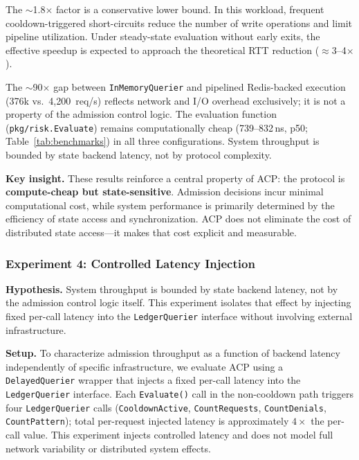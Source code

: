 \documentclass[11pt]{article}
\theoremstyle{definition}
\begin{document}
The $\sim$1.8$\times$ factor is a conservative lower bound.
In this workload, frequent cooldown-triggered short-circuits reduce the number
of write operations and limit pipeline utilization.
Under steady-state evaluation without early exits, the effective speedup
is expected to approach the theoretical RTT reduction ($\approx$3--4$\times$).

The $\sim$90$\times$ gap between \texttt{InMemoryQuerier} and pipelined Redis-backed
execution (376k vs.\ 4{,}200~req/s) reflects network and I/O overhead exclusively;
it is not a property of the admission control logic.
The evaluation function (\texttt{pkg/risk.Evaluate}) remains computationally
cheap (739--832\,ns, p50; Table~\ref{tab:benchmarks}) in all three configurations.
System throughput is bounded by state backend latency, not by protocol complexity.

\textbf{Key insight.}
These results reinforce a central property of ACP:
the protocol is \textbf{compute-cheap but state-sensitive}.
Admission decisions incur minimal computational cost, while system performance
is primarily determined by the efficiency of state access and synchronization.
ACP does not eliminate the cost of distributed state access---it makes that
cost explicit and measurable.

\subsubsection*{Experiment 4: Controlled Latency Injection}

\textbf{Hypothesis.}
System throughput is bounded by state backend latency, not by the admission
control logic itself.
This experiment isolates that effect by injecting fixed per-call latency into the
\texttt{LedgerQuerier} interface without involving external infrastructure.

\textbf{Setup.}
To characterize admission throughput as a function of backend latency independently
of specific infrastructure, we evaluate ACP using a \texttt{DelayedQuerier} wrapper
that injects a fixed per-call latency into the \texttt{LedgerQuerier} interface.
Each \texttt{Evaluate()} call in the non-cooldown path triggers four \texttt{LedgerQuerier}
calls (\texttt{CooldownActive}, \texttt{CountRequests}, \texttt{CountDenials},
\texttt{CountPattern}); total per-request injected latency is approximately
$4\times$ the per-call value.
This experiment injects controlled latency and does not model full network variability
or distributed system effects.
\end{document}

